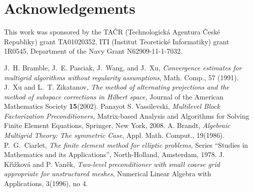 \documentclass[twoside, 12pt]{article}
\begin{document}
\section*{Acknowledgements}
This work was sponsored by the
TA\v{C}R (Technologick\'{a} Agentura \v{C}esk\'{e} Republiky)
grant TA01020352, ITI (Institut Teoretick\'{e} Informatiky) grant 1R0545, Department of the Navy Grant N62909-11-1-7032.


\begin{thebibliography}{10}
{\sc J.~H. Bramble, J.~E. Pasciak, J.~Wang, and J.~Xu}, {\em Convergence
  estimates for multigrid algorithms without regularity assumptions}, Math.
  Comp., 57 (1991).
{\sc J.~Xu and L.~T. Zikatanov,}
{\it The method of alternating projections and the method of subspace corrections in Hilbert space,}
Journal of the American Mathematics Society {\bf 15}(2002).
{\sc Panayot S. Vassilevski,} {\it Multilevel Block Factorization Preconditioners,}
Matrix-based Analysis and Algorithms for Solving Finite Element Equations, Springer, New York, 2008.
{\sc A. Brandt},
{\em Algebraic Multigrid Theory: The symmetric Case},
Appl. Math. Comput., 19(1986).
{\sc P.~G.~Ciarlet},
{\it The finite element method for elliptic problems,}
Series ``Studies in Mathematics and its Applications'', North-Holland,
Amsterdam,
1978.
{\sc J. K\v{r}\'{\i}\v{z}kov\'a and P. Van\v{e}k},
{\em Two-level preconditioner with small coarse grid appropriate
for unstructured meshes},
Numerical Linear Algebra with Applications, 3(1996), no 4.


\end{thebibliography}
\end{document}
